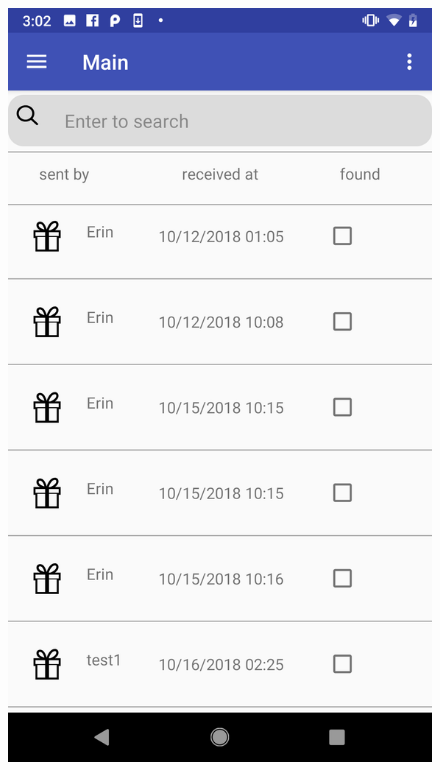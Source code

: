 \begin{figure}[H]
\centering
\begin{minipage}[t]{0.4\textwidth}
\includegraphics[width=.95\textwidth]{section03/assets/MainPage.png}
\subcaption{\label{GiftsListMainUI}}
\end{minipage}%
\begin{minipage}[t]{0.4\textwidth}

\end{minipage}
\end{figure}
